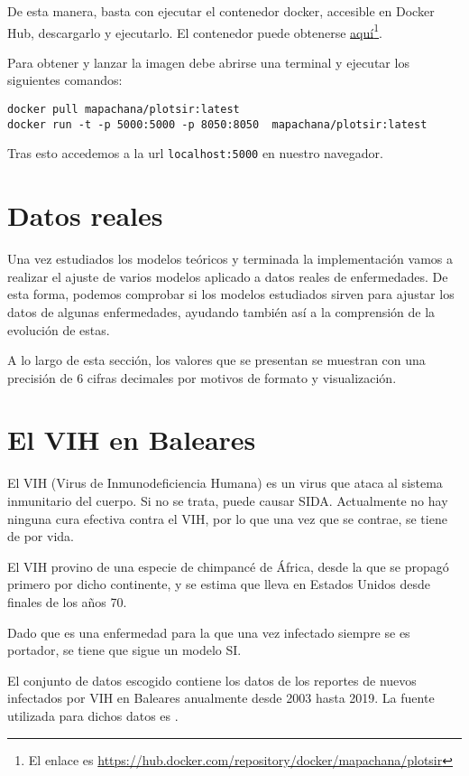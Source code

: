 De esta manera, basta con ejecutar el contenedor docker, accesible en Docker Hub, descargarlo y ejecutarlo. El contenedor puede obtenerse \href{https://hub.docker.com/repository/docker/mapachana/plotsir}{aquí}\footnote{El enlace es \href{https://hub.docker.com/repository/docker/mapachana/plotsir}{https://hub.docker.com/repository/docker/mapachana/plotsir}}.

Para obtener y lanzar la imagen debe abrirse una terminal y ejecutar los siguientes comandos:

\begin{verbatim}
docker pull mapachana/plotsir:latest
docker run -t -p 5000:5000 -p 8050:8050  mapachana/plotsir:latest
\end{verbatim}

Tras esto accedemos a la url \verb|localhost:5000| en nuestro navegador.


\section{Datos reales}

Una vez estudiados los modelos teóricos y terminada la implementación vamos a realizar el ajuste de varios modelos aplicado a datos reales de enfermedades. De esta forma, podemos comprobar si los modelos estudiados sirven para ajustar los datos de algunas enfermedades, ayudando también así a la comprensión de la evolución de estas.

A lo largo de esta sección, los valores que se presentan se muestran con una precisión de $6$ cifras decimales por motivos de formato y visualización.

\section{El VIH en Baleares}

El VIH (Virus de Inmunodeficiencia Humana) es un virus que ataca al sistema inmunitario del cuerpo. Si no se trata, puede causar SIDA. Actualmente no hay ninguna cura efectiva contra el VIH, por lo que una vez que se contrae, se tiene de por vida.

El VIH provino de una especie de chimpancé de África, desde la que se propagó primero por dicho continente, y se estima que lleva en Estados Unidos desde finales de los años 70.

Dado que es una enfermedad para la que una vez infectado siempre se es portador, se tiene que sigue un modelo SI.

El conjunto de datos escogido contiene los datos de los reportes de nuevos infectados por VIH en Baleares anualmente desde 2003 hasta 2019. La fuente utilizada para dichos datos es \cite{datos_vih}.

